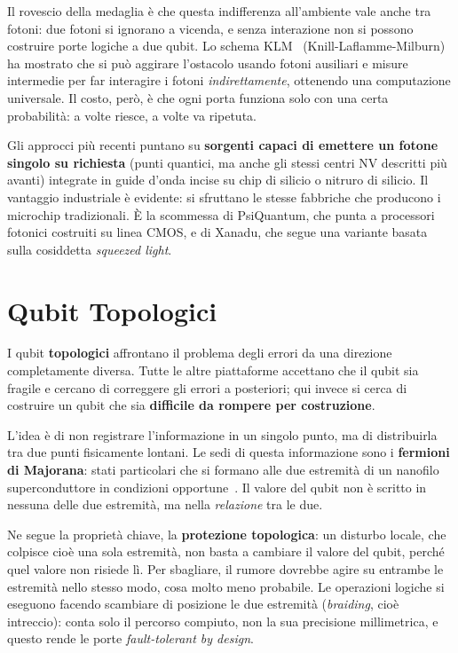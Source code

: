 Il rovescio della medaglia è che questa indifferenza all'ambiente vale anche
tra fotoni: due fotoni si ignorano a vicenda, e senza interazione non si
possono costruire porte logiche a due qubit. Lo schema
KLM~\cite{knill2001scheme} (Knill-Laflamme-Milburn) ha mostrato che si può
aggirare l'ostacolo usando fotoni ausiliari e misure intermedie per far
interagire i fotoni \textit{indirettamente}, ottenendo una computazione
universale. Il costo, però, è che ogni porta funziona solo con una certa
probabilità: a volte riesce, a volte va ripetuta.

Gli approcci più recenti puntano su \textbf{sorgenti capaci di emettere un
fotone singolo su richiesta} (punti quantici, ma anche gli stessi centri NV
descritti più avanti) integrate in guide d'onda incise su chip di silicio o
nitruro di silicio. Il vantaggio industriale è evidente: si sfruttano le stesse
fabbriche che producono i microchip tradizionali. È la scommessa di PsiQuantum,
che punta a processori fotonici costruiti su linea CMOS, e di Xanadu, che segue
una variante basata sulla cosiddetta \textit{squeezed light}.

\section{Qubit Topologici}
\label{sec:topologici}

I qubit \textbf{topologici} affrontano il problema degli errori da una
direzione completamente diversa. Tutte le altre piattaforme accettano che il
qubit sia fragile e cercano di correggere gli errori a posteriori; qui invece
si cerca di costruire un qubit che sia \textbf{difficile da rompere per
costruzione}.

L'idea è di non registrare l'informazione in un singolo punto, ma di
distribuirla tra due punti fisicamente lontani. Le sedi di questa informazione
sono i \textbf{fermioni di Majorana}: stati particolari che si formano alle due
estremità di un nanofilo superconduttore in condizioni
opportune~\cite{kitaev2003fault}. Il valore del qubit non è scritto in nessuna
delle due estremità, ma nella \textit{relazione} tra le due.

Ne segue la proprietà chiave, la \textbf{protezione topologica}: un disturbo
locale, che colpisce cioè una sola estremità, non basta a cambiare il valore
del qubit, perché quel valore non risiede lì. Per sbagliare, il rumore
dovrebbe agire su entrambe le estremità nello stesso modo, cosa molto meno
probabile. Le operazioni logiche si eseguono facendo scambiare di posizione le
due estremità (\textit{braiding}, cioè intreccio): conta solo il percorso
compiuto, non la sua precisione millimetrica, e questo rende le porte
\textit{fault-tolerant by design}.

